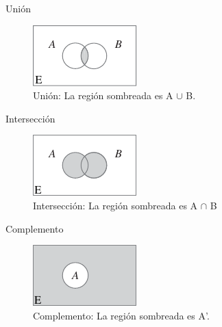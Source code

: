 \documentclass[11pt]{beamer}
\begin{document}
        \begin{frame}{Unión}
          \begin{figure}
              \centering
              \includegraphics[width=0.7\linewidth]{images/estadistica2}
              \caption{Unión: La región sombreada es A $\cup$ B.}
              \label{fig:estadistica2}
          \end{figure}

        \end{frame}
        \begin{frame}{Intersección}
          \begin{figure}
            \centering
            \includegraphics[width=0.7\linewidth]{images/estadistica3}
            \caption{Intersección: La región sombreada es A $\cap$ B}
            \label{fig:estadistica3}
          \end{figure}

        \end{frame}
        \begin{frame}{Complemento}
          \begin{figure}
            \centering
            \includegraphics[width=0.7\linewidth]{images/estadistica4}
            \caption{Complemento: La región sombreada es A'. }
            \label{fig:estadistica4}
          \end{figure}

        \end{frame}
\end{document}
